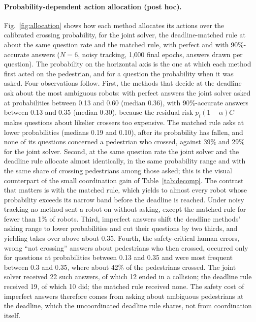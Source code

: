 \documentclass[a4paper,fleqn]{cas-dc}
\begin{document}
\paragraph{Probability-dependent action allocation (post hoc).} Fig.~\ref{fig:allocation} shows how each method allocates its actions over the calibrated crossing probability, for the joint solver, the deadline-matched rule at about the same question rate and the matched rule, with perfect and with 90\%-accurate answers ($N = 6$, noisy tracking, 1{,}000 final epochs, answers drawn per question). The probability on the horizontal axis is the one at which each method first acted on the pedestrian, and for a question the probability when it was asked. Four observations follow. First, the methods that decide at the deadline ask about the most ambiguous robots: with perfect answers the joint solver asked at probabilities between 0.13 and 0.60 (median 0.36), with 90\%-accurate answers between 0.13 and 0.35 (median 0.30), because the residual risk $p_i(1-\alpha)C$ makes questions about likelier crossers too expensive. The matched rule asks at lower probabilities (medians 0.19 and 0.10), after its probability has fallen, and none of its questions concerned a pedestrian who crossed, against 39\% and 29\% for the joint solver. Second, at the same question rate the joint solver and the deadline rule allocate almost identically, in the same probability range and with the same share of crossing pedestrians among those asked; this is the visual counterpart of the small coordination gain of Table~\ref{tab:decomp}. The contrast that matters is with the matched rule, which yields to almost every robot whose probability exceeds its narrow band before the deadline is reached. Under noisy tracking no method sent a robot on without asking, except the matched rule for fewer than 1\% of robots. Third, imperfect answers shift the deadline methods' asking range to lower probabilities and cut their questions by two thirds, and yielding takes over above about 0.35. Fourth, the safety-critical human errors, wrong ``not crossing'' answers about pedestrians who then crossed, occurred only for questions at probabilities between 0.13 and 0.35 and were most frequent between 0.3 and 0.35, where about 42\% of the pedestrians crossed. The joint solver received 22 such answers, of which 12 ended in a collision; the deadline rule received 19, of which 10 did; the matched rule received none. The safety cost of imperfect answers therefore comes from asking about ambiguous pedestrians at the deadline, which the uncoordinated deadline rule shares, not from coordination itself.
\end{document}

